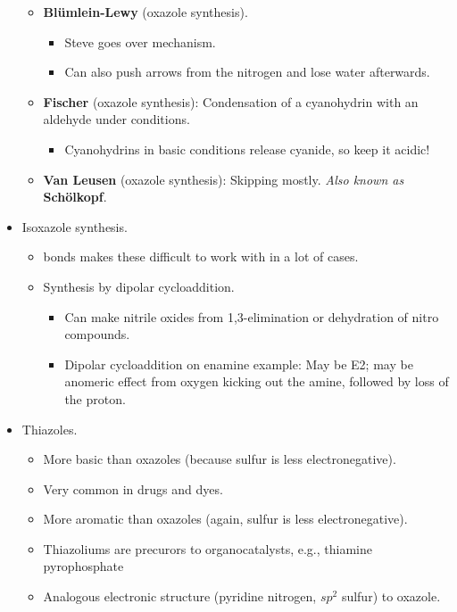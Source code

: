 \documentclass[../notes.tex]{subfiles}
\begin{document}
\begin{itemize}
\begin{itemize}
\begin{itemize}
        \end{itemize}
        \item \textbf{Bl\"{u}mlein-Lewy} (oxazole synthesis).
        \begin{itemize}
            \item Steve goes over mechanism.
            \item Can also push arrows from the nitrogen and lose water afterwards.
        \end{itemize}
        \item \textbf{Fischer} (oxazole synthesis): Condensation of a cyanohydrin with an aldehyde under  conditions.
        \begin{itemize}
            \item Cyanohydrins in basic conditions release cyanide, so keep it acidic!
        \end{itemize}
        \item \textbf{Van Leusen} (oxazole synthesis): Skipping mostly. \emph{Also known as} \textbf{Sch\"{o}lkopf}.
    \end{itemize}
    \item Isoxazole synthesis.
    \begin{itemize}
        \item {} bonds makes these difficult to work with in a lot of cases.
        \item Synthesis by dipolar cycloaddition.
        \begin{itemize}
            \item Can make nitrile oxides from 1,3-elimination or dehydration of nitro compounds.
            \item Dipolar cycloaddition on enamine example: May be E2; may be anomeric effect from oxygen kicking out the amine, followed by loss of the proton.
        \end{itemize}
    \end{itemize}
    \item Thiazoles.
    \begin{itemize}
        \item More basic than oxazoles (because sulfur is less electronegative).
        \item Very common in drugs and dyes.
        \item More aromatic than oxazoles (again, sulfur is less electronegative).
        \item Thiazoliums are precurors to organocatalysts, e.g., thiamine pyrophosphate
        \item Analogous electronic structure (pyridine nitrogen, $sp^2$ sulfur) to oxazole.

\end{itemize}
\end{itemize}
\end{document}
